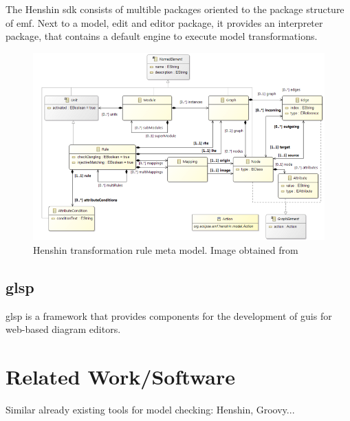\documentclass[conference,onecolumn]{IEEEtran}
\begin{document}
  The Henshin \acs{sdk} consists of multible packages oriented to the package structure of \ac{emf}. Next to a model, edit and editor package, it provides an interpreter package, that contains a default engine to execute model transformations.

  \begin{figure}[h]
    \centering
    \includegraphics[width=1\textwidth]{henshin-rule-model}
    \caption{Henshin transformation rule meta model. Image obtained from \cite{henshin-repo}}
    \label{fig:henshin-rule-model}
  \end{figure}


  \subsection{\acf{glsp}}
  \label{subsec:glsp}

  \ac{glsp} is a framework that provides components for the development of \acsp{gui} for web-based diagram editors.
  \cite{glsp-repo}

  \section{Related Work/Software}
  \label{sec:related-work}

  Similar already existing tools for model checking: Henshin, Groovy...


\end{document}
